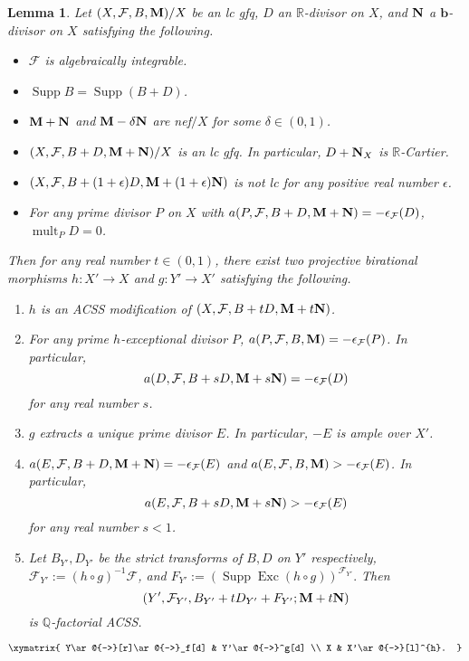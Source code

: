 \documentclass[11pt]{amsart}
\numberwithin{equation}{section}
\newcommand{\bb}{\bm{b}}
\newcommand{\Mm}{{\bf{M}}}
\newcommand{\Nn}{{\bf{N}}}
\newcommand{\Qq}{\mathbb{Q}}
\newcommand{\Rr}{\mathbb{R}}
\newcommand{\Exc}{\operatorname{Exc}}
\newcommand{\Supp}{\operatorname{Supp}}
\newcommand{\mult}{\operatorname{mult}}
\newcommand{\Ff}{\mathcal{F}}
\newtheorem{lem}[thm]{Lemma}
\theoremstyle{definition}
\theoremstyle{definition}
\theoremstyle{definition}
\begin{document}
\begin{lem}\label{lem: find nontrivial divisor on ACSS model}
Let $(X,\Ff,B,\Mm)/X$ be an lc gfq, $D$ an $\Rr$-divisor on $X$, and $\Nn$ a $\bb$-divisor on $X$ satisfying the following.
\begin{itemize}
    \item[(i)] $\Ff$ is algebraically integrable.
    \item[(ii)] $\Supp B=\Supp(B+D)$.
    \item[(iii)] $\Mm+\Nn$ and $\Mm-\delta\Nn$ are nef$/X$ for some $\delta\in(0,1)$.
    \item[(iv)] $(X,\Ff,B+D,\Mm+\Nn)/X$ is an lc gfq. In particular, $D+\Nn_X$ is $\Rr$-Cartier.
    \item[(v)] $(X,\Ff,B+(1+\epsilon)D,\Mm+(1+\epsilon)\Nn)$ is not lc for any positive real number $\epsilon$.
    \item[(vi)]  For any prime divisor $P$ on $X$ with $a(P,\Ff,B+D,\Mm+\Nn)=-\epsilon_{\Ff}(D)$, $\mult_PD=0$.
\end{itemize}
Then for any real number $t\in (0,1)$, there exist two projective birational morphisms $h: X'\rightarrow X$ and $g: Y'\rightarrow X'$ satisfying the following. 
\begin{enumerate}
    \item $h$ is an ACSS modification of $(X,\Ff,B+tD,\Mm+t\Nn)$.
    \item For any prime $h$-exceptional divisor $P$, $a(P,\Ff,B,\Mm)=-\epsilon_{\Ff}(P)$. In particular, $$a(D,\Ff,B+sD,\Mm+s\Nn)=-\epsilon_{\Ff}(D)$$ 
    for any real number $s$.
    \item $g$ extracts a unique prime divisor $E$. In particular, $-E$ is ample over $X'$.
    \item $a(E,\Ff,B+D,\Mm+\Nn)=-\epsilon_{\Ff}(E)$ and $a(E,\Ff,B,\Mm)>-\epsilon_{\Ff}(E)$. In particular,  $$a(E,\Ff,B+sD,\Mm+s\Nn)>-\epsilon_{\Ff}(E)$$ for any real number $s<1$.
    \item Let $B_{Y'},D_{Y'}$ be the strict transforms of $B,D$ on $Y'$ respectively, $\Ff_{Y'}:=(h\circ g)^{-1}\Ff$, and $F_{Y'}:=(\Supp\Exc(h\circ g))^{\Ff_{Y'}}.$ Then 
    $$(Y',\Ff_{Y'},B_{Y'}+tD_{Y'}+F_{Y'};\Mm+t\Nn)$$ 
    is $\Qq$-factorial ACSS.
\end{enumerate}
\begin{center}$\xymatrix{
Y\ar@{-->}[r]\ar@{->}_f[d] & Y'\ar@{->}^g[d] \\
X & X'\ar@{->}[l]^{h}.
}$
\end{center}
\end{lem}
\end{document}
